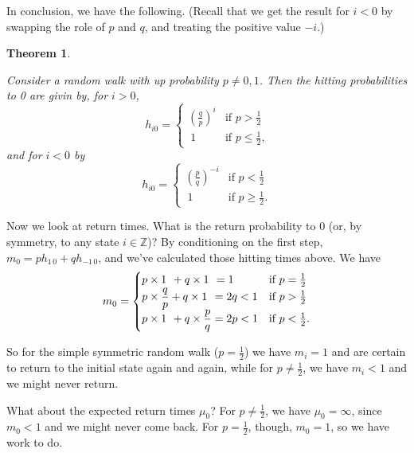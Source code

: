 \documentclass[
  a4paper,
]{article}
\newtheorem{theorem}{Theorem}[section]
\theoremstyle{definition}
\theoremstyle{definition}
\theoremstyle{definition}
\theoremstyle{remark}
\begin{document}
In conclusion, we have the following. (Recall that we get the result for \(i < 0\) by swapping the role of \(p\) and \(q\), and treating the positive value \(-i\).)

\begin{theorem}
\protect\hypertarget{thm:rw-hitting}{}\label{thm:rw-hitting}

Consider a random walk with up probability \(p \neq 0, 1\). Then the hitting probabilities to 0 are givin by, for \(i > 0\),
\[ h_{i0} = \begin{cases} \left(\displaystyle\frac{q}{p}\right)^i & \text{if $p > \frac12$} \\ \ 1 & \text{if $p \leq \frac12$,} \end{cases} \]
and for \(i < 0\) by
\[ h_{i0} = \begin{cases} \left(\displaystyle\frac{p}{q}\right)^{-i} & \text{if $p < \frac12$} \\ \ 1 & \text{if $p \geq \frac12$.} \end{cases} \]

\end{theorem}

Now we look at return times. What is the return probability to 0 (or, by symmetry, to any state \(i \in \mathbb Z\))? By conditioning on the first step, \(m_0 = ph_{1\,0} + qh_{-1\,0}\), and we've calculated those hitting times above. We have
\[ m_0 = \begin{cases} p\times 1 \hspace{0.4em}+ q\times 1 \hspace{0.4em}= 1 & \text{if $p = \frac12$} \\
p \times \displaystyle\frac qp + q\times 1 \hspace{0.4em}= 2q < 1 & \text{if $p > \frac12$} \\
p\times 1 \hspace{0.4em} + q \times \displaystyle\frac pq = 2p < 1 & \text{if $p < \frac12$.}\end{cases} \]

So for the simple symmetric random walk (\(p = \frac12\)) we have \(m_i = 1\) and are certain to return to the initial state again and again, while for \(p \neq \frac12\), we have \(m_i < 1\) and we might never return.

What about the expected return times \(\mu_{0}\)? For \(p \neq \frac12\), we have \(\mu_{0} = \infty\), since \(m_0 < 1\) and we might never come back. For \(p = \frac12\), though, \(m_0 = 1\), so we have work to do.
\end{document}

